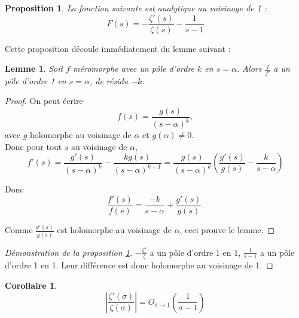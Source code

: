 \documentclass[french]{report}
\newtheorem{proposition}[theorem]{Proposition}
\newtheorem{corollary}[theorem]{Corollaire}
\newtheorem{lemma}[theorem]{Lemme}
\begin{document}
\begin{proposition}\label{prop:zeta-sur-zeta-prime-1-sur-holomorphe}
  La fonction suivante est analytique au voisinage de 1 :
  \[ F(s) = - \frac{\zeta'(s)}{\zeta(s)} - \frac{1}{s-1} \]
\end{proposition}

Cette proposition découle immédiatement du lemme suivant :

\begin{lemma}
  Soit $f$ méromorphe avec un pôle d'ordre $k$ en $s=\alpha$. Alors $\frac{f}{f'}$ a un pôle d'ordre 1 en $s=\alpha$, de résidu $-k$.
\end{lemma}

\begin{proof}
  On peut écrire
  \[ f(s) = \frac{g(s)}{(s-\alpha)^k},\]
  avec $g$ holomorphe au voisinage de $\alpha$ et $g(\alpha)\neq0$.
  \\

  Donc pour tout $s$ au voisinage de $\alpha$,
  \[
    f'(s)
    = \frac{g'(s)}{(s-\alpha)^k}-\frac{kg(s)}{(s-\alpha)^{k+1}}
    = \frac{g(s)}{(s-\alpha)^k}\left(\frac{g'(s)}{g(s)}-\frac{k}{s-\alpha}\right)
  \]

  Donc
  \[
    \frac{f'(s)}{f(s)} = \frac{-k}{s-\alpha}+\frac{g'(s)}{g(s)}.
  \]

  Comme $\frac{g'(s)}{g(s)}$ est holomorphe au voisinage de $\alpha$, ceci prouve le lemme.
\end{proof}

\begin{proof}[Démonstration de la proposition \ref{prop:zeta-sur-zeta-prime-1-sur-holomorphe}]
 $-\frac{\zeta'}{\zeta}$ a un pôle d'ordre 1 en 1, $\frac{1}{s-1}$ a un pôle d'ordre 1 en 1. Leur différence est donc holomorphe au voisinage de 1.
\end{proof}

\begin{corollary}\label{cor:zeta-sur-zeta-prime-o}
  \[ \left|\frac{\zeta'(\sigma)}{\zeta(\sigma)}\right| = O_{\sigma\to1}\left(\frac{1}{\sigma-1}\right) \]
\end{corollary}

\end{document}
